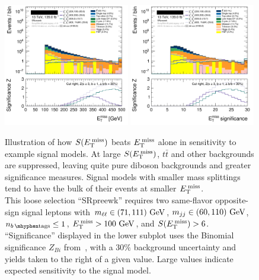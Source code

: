 \begin{figure}[tp]
\centering
\includegraphics[width=0.49\textwidth]{figures/2ljets_presel_met_logy.png}
\hfill
\includegraphics[width=0.49\textwidth]{figures/2ljets_presel_met_sig_logy.png}
\caption{
Illustration of how $\metsig$ beats $\met$ alone in sensitivity to
example signal models.
At large $\metsig$, $t\bar t$ and other backgrounds are suppressed, leaving
quite pure diboson backgrounds and greater significance measures.
Signal models with smaller mass splittings tend to have the bulk of their
events at smaller $\met$.
\\[0.5em]
This loose selection ``SRpreewk'' requires two same-flavor opposite-sign
signal leptons with
$\mll \in (71, 111)~\eV[G]$,
$\mjj \in (60, 110)~\eV[G]$,
$\nbtag \leq 1$,
$\met > 100~\eV[G]$, and
$\metsig > 6$.
\\[0.5em]
``Significance'' displayed in the lower subplot uses the Binomial significance
$Z_{Bi}$ from~\cite{cousins2008evaluation}, with a $30\%$ background
uncertainty and yields taken to the right of a given value.
Large values indicate expected sensitivity to the signal model.
}
\label{fig:2ljets_presel_met}
\end{figure}



